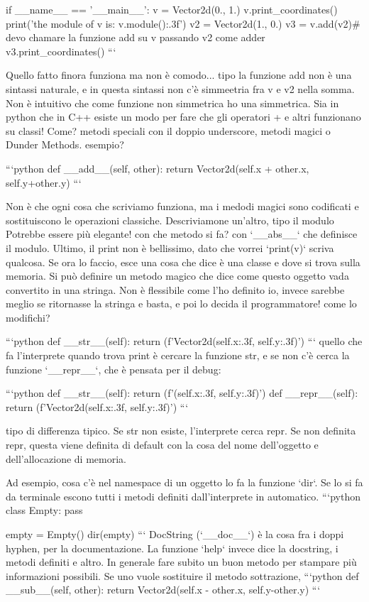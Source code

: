 \documentclass[10pt, a4paper, twosided, titlepage, draft]{book}
\begin{document}
if __name__ == '__main__':
v = Vector2d(0., 1.)
v.print_coordinates()
print('the module of v is: {v.module():.3f}')
v2 = Vector2d(1., 0.)
v3 = v.add(v2)# devo chamare la funzione add su v passando v2 come adder
v3.print_coordinates()
```

Quello fatto finora funziona ma non è comodo... tipo la funzione add non è una sintassi naturale, e in questa sintassi non c'è simmeetria fra v e v2 nella somma. Non è intuitivo che come funzione non simmetrica ho una simmetrica.
Sia in python che in C++ esiste un modo per fare che gli operatori + e altri funzionano su classi!
Come? metodi speciali con il doppio underscore, metodi magici o Dunder Methods.
esempio? 

```python
def __add__(self, other):
return Vector2d(self.x + other.x, self.y+other.y)
```

Non è che ogni cosa che scriviamo funziona, ma i medodi magici sono codificati e sostituiscono le operazioni classiche.
Descriviamone un'altro, tipo il modulo
Potrebbe essere più elegante! con che metodo si fa? con `__abs__` che definisce il modulo.
Ultimo, il print non è bellissimo, dato che vorrei `print(v)` scriva qualcosa. Se ora lo faccio, esce una cosa che dice è una classe e dove si trova sulla memoria.
Si può definire un metodo magico che dice come questo oggetto vada convertito in una stringa.
Non è flessibile come l'ho definito io, invece sarebbe meglio se ritornasse la stringa e basta, e poi lo decida il programmatore!
come lo modifichi?

```python
def __str__(self):
return (f'Vector2d({self.x:.3f}, {self.y:.3f})')
```
quello che fa l'interprete quando trova print è cercare la funzione str, e se non c'è cerca la funzione `__repr__`, che è pensata per il debug:

```python
def __str__(self):
return (f'({self.x:.3f}, {self.y:.3f})')
def __repr__(self):
return (f'Vector2d({self.x:.3f}, {self.y:.3f})')
```

tipo di differenza tipico.
Se str non esiste, l'interprete cerca repr. Se non definita repr, questa viene definita di default con la cosa del nome dell'oggetto e dell'allocazione di memoria.

Ad esempio, cosa c'è nel namespace di un oggetto lo fa la funzione `dir`. Se lo si fa da terminale escono tutti i metodi definiti dall'interprete in automatico.
```python
class Empty:
pass

empty = Empty()
dir(empty)
```
DocString (`__doc__`) è la cosa fra i doppi hyphen, per la documentazione.
La funzione `help` invece dice la docstring, i metodi definiti e altro.
In generale fare subito un buon metodo per stampare più informazioni possibili.
Se uno vuole sostituire il metodo sottrazione, 
```python
def __sub__(self, other):
return Vector2d(self.x - other.x, self.y-other.y)
```
\end{document}
